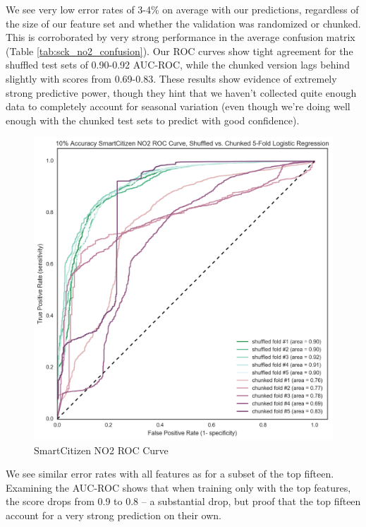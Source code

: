 We see very low error rates of 3-4\% on average with our predictions, regardless of the size of our feature set and whether the validation was randomized or chunked.  This is corroborated by very strong performance in the average confusion matrix (Table \ref{tab:sck_no2_confusion}).  Our ROC curves show tight agreement for the shuffled test sets of 0.90-0.92 AUC-ROC, while the chunked version lags behind slightly with scores from 0.69-0.83.  These results show evidence of extremely strong predictive power, though they hint that we haven't collected quite enough data to completely account for seasonal variation (even though we're doing well enough with the chunked test sets to predict with good confidence).



\begin{figure}[htb]
 	\includegraphics[width=\textwidth]{figs/sck_no2_10_roc}               
 	 \caption{SmartCitizen NO2 ROC Curve}
  	\label{fig:sck_no2_10_roc}
\end{figure}


We see similar error rates with all features as for a subset of the top fifteen.  Examining the AUC-ROC shows that when training only with the top features, the score drops from 0.9 to 0.8 -- a substantial drop, but proof that the top fifteen account for a very strong prediction on their own.
 
